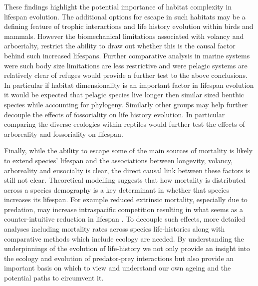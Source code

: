 


These findings highlight the potential importance of habitat complexity in lifespan evolution. The additional options for escape in such habitats may be a defining feature of trophic interactions and life history evolution within birds and mammals. However the biomechanical limitations associated with volancy and arboerialty, restrict the ability to draw out whether this is the causal factor behind such increased lifespans. Further comparative analysis in marine systems were such body size limitations are less restrictive and were pelagic systems are relatively clear of refuges would provide a further test to the above conclusions. In particular if habitat dimensionality is an important factor in lifespan evolution it would be expected that pelagic species live longer then similar sized benthic species while accounting for phylogeny. Similarly other groups may help further decouple the effects of fossoriality on life history evolution. In particular comparing the diverse ecologies within reptiles would further test the effects of arboreality and fossoriality on lifespan.

Finally, while the ability to escape some of the main sources of mortality is likely to extend species' lifespan and the associations between longevity, volancy, arboreality and eusocialty is clear, the direct causal link between these factors is still not clear. Theoretical modelling suggests that how mortality is distributed across a species demography is a key determinant in whether that species increases its lifespan. For example reduced extrinsic mortality, especially due to predation, may increase intraspacific competition resulting in what seems as a counter-intuitive reduction in lifespan \citep{moorad2010evolution}. To decouple such effects, more detailed analyses including mortality rates across species life-histories along with comparative methods which include ecology are needed. By understanding the underpinnings of the evolution of life-history we not only provide an insight into the ecology and evolution of predator-prey interactions but also provide an important basis on which to view and understand our own ageing and the potential paths to circumvent it.



%
%


